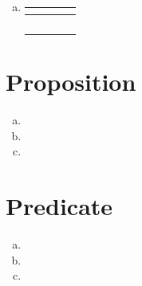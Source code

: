 \documentclass{article}
\begin{document}
\begin{enumerate}[(a)]
          \begin{tabu}{ccc|cc}
              $  $&$  $&$  $&$  $&$  $ \\
              \hline
                &   &   &   &   \\
                &   &   &   &   \\
                &   &   &   &   \\
                &   &   &   &   \\
                &   &   &   &   \\
                &   &   &   &   \\
                &   &   &   &   \\
                &   &   &   &   \\
          \end{tabu}

    \item %

          \begin{tabu}{cc|cc}
              $  $&$  $&$  $&$  $ \\
              \hline
               &  &  &  \\
               &  &  &  \\
               &  &  &  \\
               &  &  &  \\
          \end{tabu}

\end{enumerate}





\section{Proposition}
\begin{enumerate}[(a)]
    \item
    \item
    \item
\end{enumerate}





\section{Predicate}
\begin{enumerate}[(a)]
    \item
    \item
    \item
\end{enumerate}
\end{document}
